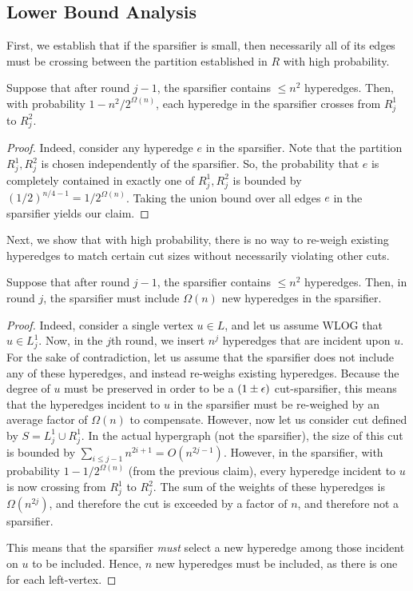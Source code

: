 \documentclass{article}
\begin{document}
\subsection{Lower Bound Analysis}

First, we establish that if the sparsifier is small, then necessarily all of its edges must be crossing between the partition established in $R$ with high probability. 

\begin{claim}
    Suppose that after round $j-1$, the sparsifier contains $\leq n^2$ hyperedges. Then, with probability $1 - n^2 / 2^{\Omega(n)}$, each hyperedge in the sparsifier crosses from $R_j^1$ to $R_j^2$.
\end{claim}

\begin{proof}
    Indeed, consider any hyperedge $e$ in the sparsifier. Note that the partition $R_j^1, R_j^2$ is chosen independently of the sparsifier. So, the probability that $e$ is completely contained in exactly one of $R_j^1, R_j^2$ is bounded by $(1/2)^{n/4-1} = 1 / 2^{\Omega(n)}$. Taking the union bound over all edges $e$ in the sparsifier yields our claim. 
\end{proof}

Next, we show that with high probability, there is no way to re-weigh existing hyperedges to match certain cut sizes without necessarily violating other cuts. 

\begin{claim}
    Suppose that after round $j-1$, the sparsifier contains $\leq n^2$ hyperedges. Then, in round $j$, the sparsifier must include $\Omega(n)$ new hyperedges in the sparsifier. 
\end{claim}

\begin{proof}
    Indeed, consider a single vertex $u \in L$, and let us assume WLOG that $u \in L_j^1$. Now, in the $j$th round, we insert $n^j$ hyperedges that are incident upon $u$. For the sake of contradiction, let us assume that the sparsifier does not include any of these hyperedges, and instead re-weighs existing hyperedges. Because the degree of $u$ must be preserved in order to be a $(1 \pm \epsilon)$ cut-sparsifier, this means that the hyperedges incident to $u$ in the sparsifier must be re-weighed by an average factor of $\Omega(n)$ to compensate. However, now let us consider cut defined by $S = L_j^1 \cup R_j^1$. In the actual hypergraph (not the sparsifier), the size of this cut is bounded by $\sum_{i \leq j-1} n^{2i+1} = O(n^{2j-1})$. However, in the sparsifier, with probability $1 - 1 / 2^{\Omega(n)}$ (from the previous claim), every hyperedge incident to $u$ is now crossing from $R_j^1 $ to $R_j^2$. The sum of the weights of these hyperedges is $\Omega(n^{2j})$, and therefore the cut is exceeded by a factor of $n$, and therefore not a sparsifier. 

    This means that the sparsifier \emph{must} select a new hyperedge among those incident on $u$ to be included. Hence, $n$ new hyperedges must be included, as there is one for each left-vertex. 
\end{proof}
\end{document}
